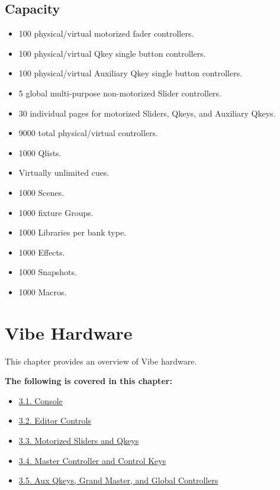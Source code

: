 \documentclass[
]{article}
\providecommand{\tightlist}{%
  \setlength{\itemsep}{0pt}\setlength{\parskip}{0pt}}
\begin{document}
\hypertarget{capacity}{%
\subsection{Capacity}\label{capacity}}

\begin{itemize}
\item
  100 physical/virtual motorized fader controllers.
\item
  100 physical/virtual Qkey single button controllers.
\item
  100 physical/virtual Auxiliary Qkey single button controllers.
\item
  5 global multi-purpose non-motorized Slider controllers.
\item
  30 individual pages for motorized Sliders, Qkeys, and Auxiliary Qkeys.
\item
  9000 total physical/virtual controllers.
\item
  1000 Qlists.
\item
  Virtually unlimited cues.
\item
  1000 Scenes.
\item
  1000 fixture Groups.
\item
  1000 Libraries per bank type.
\item
  1000 Effects.
\item
  1000 Snapshots.
\item
  1000 Macros.
\end{itemize}

\hypertarget{vibe-hardware}{%
\section{Vibe Hardware}\label{vibe-hardware}}

This chapter provides an overview of Vibe hardware.

\textbf{The following is covered in this chapter:}

\begin{itemize}
\tightlist
\item
  \href{https://vibemanual.compulite.com/vibe-hardware.html\#console}{3.1. Console}
\item
  \href{https://vibemanual.compulite.com/vibe-hardware.html\#editor-controls}{3.2. Editor Controls}
\item
  \href{https://vibemanual.compulite.com/vibe-hardware.html\#motorized-sliders-and-qkeys}{3.3. Motorized Sliders and Qkeys}
\item
  \href{https://vibemanual.compulite.com/vibe-hardware.html\#master-controller-and-control-keys}{3.4. Master Controller and Control Keys}
\item
  \href{https://vibemanual.compulite.com/vibe-hardware.html\#aux-qkeys-grand-master-and-global-controllers}{3.5. Aux Qkeys, Grand Master, and Global Controllers}
\end{itemize}
\end{document}
